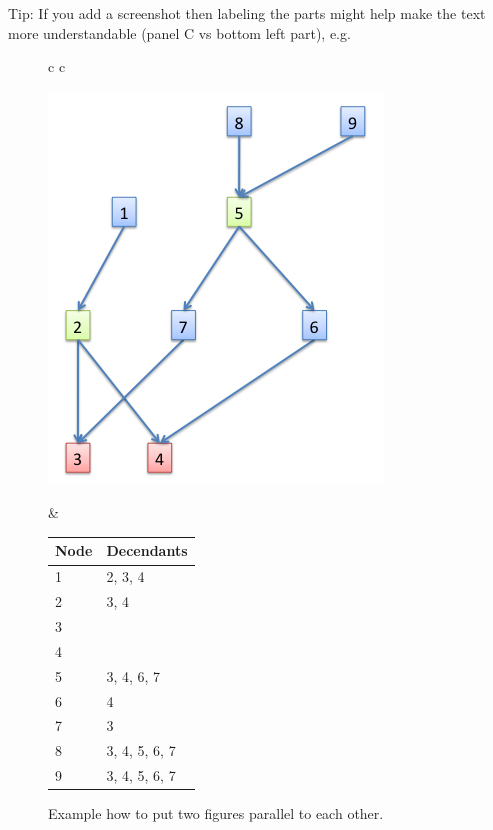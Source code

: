 \documentclass[12pt]{article}
\begin{document}
Tip: If you add a screenshot then labeling the parts might help make the text more understandable (panel C vs bottom left part), e.g.


\begin{figure} [htbp]
\begin{tabular}{c c}
%
\begin{minipage}{0.45\textwidth}
\includegraphics[width=\textwidth]{LCA_2_solutions}
\end{minipage}
%
&
\begin{minipage}{0.55\textwidth}
\centering
\begin{tabular}{ l | l |}
	Node & Decendants \\ \hline
  1 & 2, 3, 4 \\ \hline
  2 & 3, 4 \\ \hline
  3 & \\ \hline
  4 & \\ \hline
  5 & 3, 4, 6, 7 \\ \hline
  6 & 4 \\ \hline
  7 & 3 \\  \hline
  8 & 3, 4, 5, 6, 7\\ \hline
  9 & 3, 4, 5, 6, 7\\ \hline
\end{tabular}
\end{minipage}
\end{tabular}
%
\caption{Example how to put two figures parallel to each other.}
\label{fig:LCA_2_solutions}
\end{figure}
\end{document}
